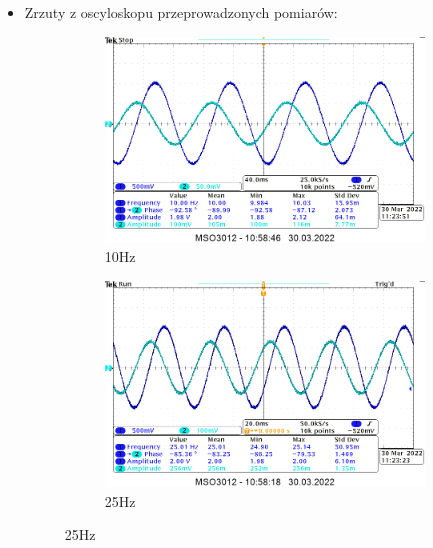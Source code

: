 \begin{itemize}
    \item Zrzuty z oscyloskopu przeprowadzonych pomiarów:
        \begin{figure}[H]
            \centering
            \begin{subfigure}[h]{0.4\textwidth}
                \includegraphics[width=\textwidth]{img_osciloscope/CLR/CLR_10Hz_cropped.png}
                \caption*{10Hz}
            \end{subfigure}
            \begin{subfigure}[h]{0.4\textwidth}
                \includegraphics[width=\textwidth]{img_osciloscope/CLR/CLR_25Hz_cropped.png}
                \caption*{25Hz}
            \end{subfigure}
        \end{figure}
        \begin{figure}[H]
            \centering
            \begin{subfigure}[h]{0.4\textwidth}

\end{subfigure}
\end{figure}
\end{itemize}
